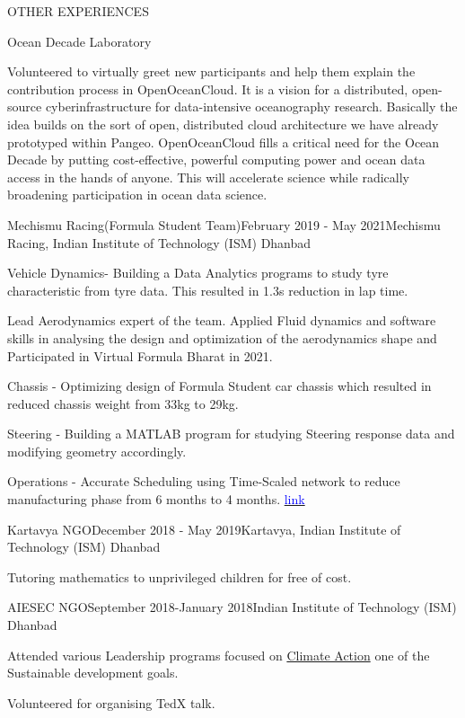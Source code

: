 \documentclass{resume} %
\begin{document}
\begin{rSection}{OTHER EXPERIENCES}
\begin{rSubsection}{Ocean Decade Laboratory}{}{}
\item Volunteered to virtually greet new participants and help them explain the contribution process in OpenOceanCloud. It is a vision for a distributed, open-source cyberinfrastructure for data-intensive oceanography research. Basically the idea builds on the sort of open, distributed cloud architecture we have already prototyped within Pangeo. OpenOceanCloud fills a critical need for the Ocean Decade by putting cost-effective, powerful computing power and ocean data access in the hands of anyone. This will accelerate science while radically broadening participation in ocean data science. 
\end{rSubsection}

\begin{rSubsection}{Mechismu Racing(Formula Student Team)}{February 2019 - May 2021}{Mechismu Racing, Indian Institute of Technology (ISM) Dhanbad}
\item Vehicle Dynamics- Building a Data Analytics programs to study tyre characteristic from tyre data. This resulted in 1.3s reduction in lap time.
\item Lead Aerodynamics expert of the team. Applied Fluid dynamics and software skills in analysing the design and optimization of the aerodynamics shape and Participated in Virtual Formula Bharat in 2021. 
\item Chassis - Optimizing design of Formula Student car chassis which resulted in reduced chassis weight from 33kg to 29kg.
\item Steering - Building a MATLAB program for studying Steering response data and modifying geometry accordingly.
\item Operations - Accurate Scheduling using Time-Scaled network to reduce manufacturing phase from 6 months to 4 months.
\href{https://drive.google.com/file/d/1gxg4ES_sFsu9u8YnKFnXOZkrpout1oJu/view?usp=sharing}{\textcolor{blue}{link}}

\end{rSubsection}

\begin{rSubsection}{Kartavya NGO}{December 2018 - May 2019}{Kartavya, Indian Institute of Technology (ISM) Dhanbad}
\item Tutoring mathematics to unprivileged children for free of cost. 
\end{rSubsection}

\begin{rSubsection}{AIESEC NGO}{September 2018-January 2018}{Indian Institute of Technology (ISM) Dhanbad}
\item Attended various Leadership programs focused on \underline{Climate Action} one of the Sustainable development goals.
\item Volunteered for organising TedX talk. 
\end{rSubsection}

\end{rSection}
\end{document}
